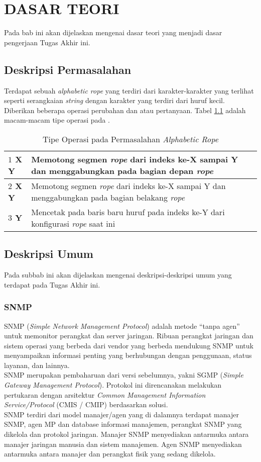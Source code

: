\chapter{DASAR TEORI}
Pada bab ini akan dijelaskan mengenai dasar teori yang menjadi dasar pengerjaan Tugas Akhir ini.

\section{Deskripsi Permasalahan} \label{section:deskripsi_permasalahan}
Terdapat sebuah \textit{alphabetic rope}\cite{arope} yang terdiri dari karakter-karakter yang terlihat seperti serangkaian \textit{string} dengan karakter yang terdiri dari huruf kecil. Diberikan beberapa operasi perubahan dan atau pertanyaan. Tabel \ref{tab:tipeoperasi} adalah macam-macam tipe operasi pada \problem{}.
\begin{table}[H]
\centering
\begin{tabular}{|p{1cm}|p{8cm}|}
	\hline
	\textbf{$1$ X Y} & Memotong segmen \textit{rope} dari indeks ke-X sampai Y dan menggabungkan pada bagian depan \textit{rope}\\ \hline
	\textbf{$2$ X Y} & Memotong segmen \textit{rope} dari indeks ke-X sampai Y dan menggabungkan pada bagian belakang \textit{rope}\\ \hline
	\textbf{$3$ Y} & Mencetak pada baris baru huruf pada indeks ke-Y dari konfigurasi \textit{rope} saat ini\\ \hline
\end{tabular}
\caption{Tipe Operasi pada Permasalahan \textit{Alphabetic Rope} \label{tab:tipeoperasi}}
\end{table}


\section{Deskripsi Umum}
\tab Pada subbab ini akan dijelaskan mengenai deskripsi-deskripsi umum yang terdapat pada Tugas Akhir ini.

\subsection{SNMP}
\tab SNMP (\textit{Simple Network Management Protocol}) adalah metode “tanpa agen” untuk memonitor perangkat dan server jaringan. Ribuan perangkat jaringan dan sistem operasi yang berbeda dari vendor yang berbeda mendukung SNMP untuk menyampaikan informasi penting yang berhubungan dengan penggunaan, status layanan, dan lainnya.\\
\tab SNMP merupakan pembaharuan dari versi sebelumnya, yakni SGMP (\textit{Simple Gateway Management Protocol}). Protokol ini direncanakan melakukan pertukaran dengan arsitektur \textit{Common Management Information Service/Protocol} (CMIS / CMIP) berdasarkan solusi.\\
\tab SNMP terdiri dari model manajer/agen yang di dalamnya terdapat manajer SNMP, agen MP dan database informasi manajemen, perangkat SNMP yang dikelola dan protokol jaringan. Manajer SNMP menyediakan antarmuka antara manajer jaringan manusia dan sistem manajemen. Agen SNMP menyediakan antarmuka antara manajer dan perangkat fisik yang sedang dikelola.


